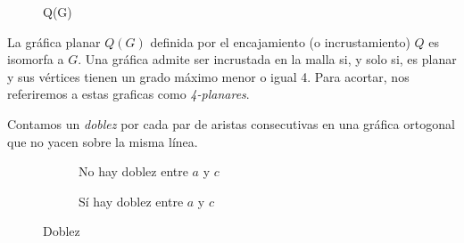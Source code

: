 \begin{figure}
  \begin{subfigure}{0.5\textwidth}
  \end{subfigure}
  \begin{subfigure}{0.4\textwidth}
  \end{subfigure}
  \caption{Q(G)}
\end{figure}

La gr\'afica planar $Q(G)$ definida por el encajamiento (o incrustamiento) $Q$ es isomorfa a $G$. Una gr\'afica admite ser incrustada en la malla si, y solo si, es planar y sus v\'ertices tienen un grado m\'aximo menor o igual 4. Para acortar, nos referiremos a estas graficas como \emph{4-planares}.

\begin{definition}[Doblez]
Contamos un \emph{doblez}\cite{minbends} por cada par de aristas consecutivas en una gr\'afica ortogonal que no yacen sobre la misma l\'inea.
\end{definition}

\begin{figure}
  \begin{subfigure}{0.4\textwidth}
    \caption{No hay doblez entre $a$ y $c$}
  \end{subfigure}
  \begin{subfigure}{0.4\textwidth}
    \caption{S\'i hay doblez entre $a$ y $c$}
  \end{subfigure}
  \caption{Doblez}
\end{figure}

